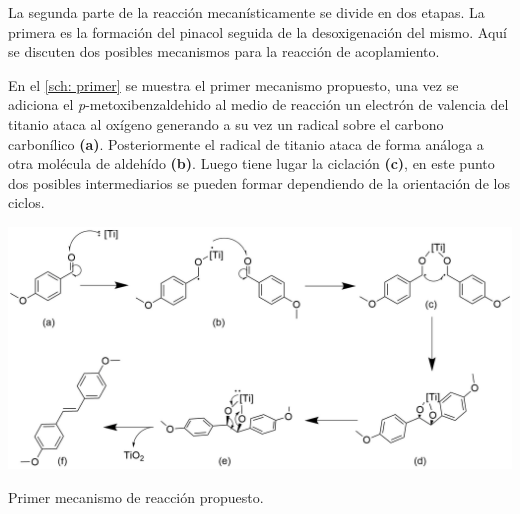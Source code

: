 \documentclass[fleqn,11pt]{SelfArx}
\begin{document}
La segunda parte de la reacci\'on mecan\'isticamente se divide en dos etapas. La primera es la formaci\'on del pinacol seguida de la desoxigenaci\'on del mismo. Aquí se discuten dos posibles mecanismos para la reacci\'on de acoplamiento. 

En el \autoref{sch: primer} se muestra el primer mecanismo propuesto, una vez se adiciona el \textit{p}-metoxibenzaldehido al medio de reacci\'on un electr\'on de valencia del titanio ataca al ox\'igeno generando a su vez un radical sobre el carbono carbon\'ilico \textbf{(a)}. Posteriormente el radical de titanio ataca de forma an\'aloga a otra mol\'ecula de aldeh\'ido \textbf{(b)}. Luego tiene lugar la ciclaci\'on \textbf{(c)}, en este punto dos posibles intermediarios se pueden formar dependiendo de la orientaci\'on de los ciclos.

\begin{scheme}[h]
	\centering
	\includegraphics[width = \linewidth]{structures/mechanism.png}
	\caption{Primer mecanismo de reacci\'on propuesto.}
	\label{sch: primer}
\end{scheme}
\end{document}

